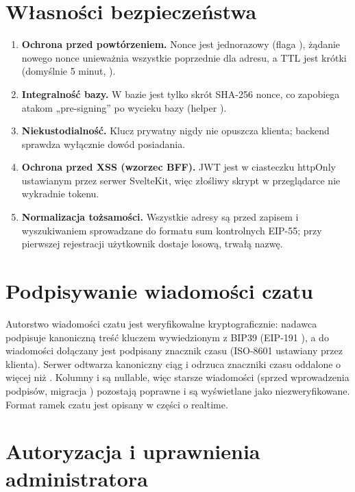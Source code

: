 \section{Własności bezpieczeństwa}
\label{sec:tozs-wlasnosci}

\begin{enumerate}
  \item \textbf{Ochrona przed powtórzeniem.} Nonce jest jednorazowy (flaga ),
        żądanie nowego nonce unieważnia wszystkie poprzednie dla adresu, a TTL jest
        krótki (domyślnie 5 minut, ).
  \item \textbf{Integralność bazy.} W bazie jest tylko skrót SHA-256 nonce, co
        zapobiega atakom „pre-signing” po wycieku bazy (helper ).
  \item \textbf{Niekustodialność.} Klucz prywatny nigdy nie opuszcza klienta; backend
        sprawdza wyłącznie dowód posiadania.
  \item \textbf{Ochrona przed XSS (wzorzec BFF).} JWT jest w ciasteczku httpOnly
        ustawianym przez serwer SvelteKit, więc złośliwy skrypt w przeglądarce nie
        wykradnie tokenu.
  \item \textbf{Normalizacja tożsamości.} Wszystkie adresy są przed zapisem i
        wyszukiwaniem sprowadzane do formatu sum kontrolnych EIP-55; przy pierwszej
        rejestracji użytkownik dostaje losową, trwałą nazwę.
\end{enumerate}

\section{Podpisywanie wiadomości czatu}
\label{sec:tozs-czat}

Autorstwo wiadomości czatu jest weryfikowalne kryptograficznie: nadawca podpisuje
kanoniczną treść kluczem wywiedzionym z BIP39 (EIP-191 ), a do
wiadomości dołączany jest podpisany znacznik czasu  (ISO-8601 ustawiany
przez klienta). Serwer odtwarza kanoniczny ciąg i odrzuca znaczniki czasu oddalone
o więcej niż . Kolumny  i 
są nullable, więc starsze wiadomości (sprzed wprowadzenia podpisów, migracja
) pozostają poprawne i są wyświetlane jako niezweryfikowane. Format
ramek czatu jest opisany w części o realtime.

\section{Autoryzacja i uprawnienia administratora}
\label{sec:tozs-admin}

